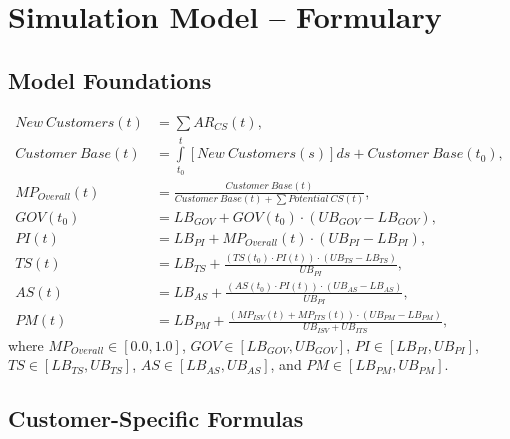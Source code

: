 \chapter{Simulation Model -- Formulary}\label{ch:app04}

\section{Model Foundations}\label{ch:app04:mf}
\begin{align}
	\mathit{New~Customers(t)} &= \sum AR_{CS}(t),\\
	\mathit{Customer~Base(t)} &= \int\limits_{t_0}^t \mathit{[New~Customers(s)]ds} + \mathit{Customer~Base(t_0)},\\
	MP_{Overall}(t) &= \frac{\mathit{Customer~Base(t)}}{\mathit{Customer~Base(t)} + \sum \mathit{Potential~CS(t)}},\\
	GOV(t_0) &= LB_{GOV} + GOV(t_0) \cdot (UB_{GOV} - LB_{GOV}),\\
	PI(t) &= LB_{PI} + MP_{Overall}(t) \cdot (UB_{PI} - LB_{PI}),\\
	TS(t) &= LB_{TS} +  \frac{(TS(t_0) \cdot PI(t)) \cdot (UB_{TS} - LB_{TS})}{UB_{PI}},\\
	AS(t) &= LB_{AS} +  \frac{(AS(t_0)  \cdot PI(t)) \cdot (UB_{AS} - LB_{AS})}{UB_{PI}},\\
	PM(t) &= LB_{PM} + \frac{(MP_{ISV}(t) + MP_{ITS}(t)) \cdot (UB_{PM} - LB_{PM})}{UB_{ISV} + UB_{ITS}},
\end{align}
where $MP_{Overall} \in [0.0,1.0]$, $GOV \in [LB_{GOV},UB_{GOV}]$, $PI \in [LB_{PI},UB_{PI}]$, $TS \in [LB_{TS},UB_{TS}]$, $AS \in [LB_{AS},UB_{AS}]$, and $PM \in [LB_{PM},UB_{PM}]$.
	
\newpage

\section{Customer-Specific Formulas}\label{ch:app04:csf}


